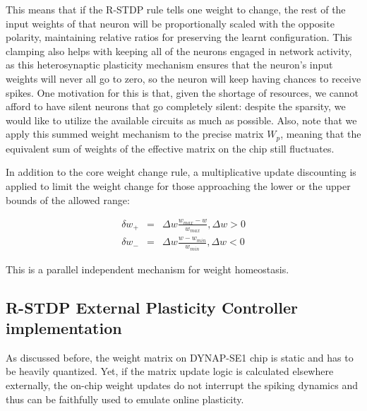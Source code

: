 This means that if the R-STDP rule tells one weight to change, the rest of the input weights of that neuron will be proportionally scaled with the opposite polarity, maintaining relative ratios for preserving the learnt configuration.
This clamping also helps with keeping all of the neurons engaged in network activity, as this heterosynaptic plasticity mechanism ensures that the neuron's input weights will never all go to zero, so the neuron will keep having chances to receive spikes. One motivation for this is that, given the shortage of resources, we cannot afford to have silent neurons that go completely silent: despite the sparsity, we would like to utilize the available circuits as much as possible.
Also, note that we apply this summed weight mechanism to the precise matrix $W_p$, meaning that the equivalent sum of weights of the effective matrix on the chip still fluctuates.

In addition to the core weight change rule, a multiplicative update discounting is applied to limit the weight change for those approaching the lower or the upper bounds of the allowed range: 

\begin{eqnarray}
\delta w_+ & =  &\Delta w \frac{w_{max} - w}{w_{max}}, \Delta w > 0 \\
\delta w_- & = & \Delta w \frac {w - w_{min}}{w_{min}}, \Delta w < 0
\label{eq:multiplicative_STDP_limiting}
\end{eqnarray}

This is a parallel independent mechanism for weight homeostasis.



\subsection{R-STDP External Plasticity Controller implementation}
\label{subsec:RSTDP_EPC}


As discussed before, the weight matrix on DYNAP-SE1 chip is static and has to be heavily quantized. Yet, if the matrix update logic is calculated elsewhere externally, the on-chip weight updates do not interrupt the spiking dynamics and thus can be faithfully used to emulate online plasticity.


